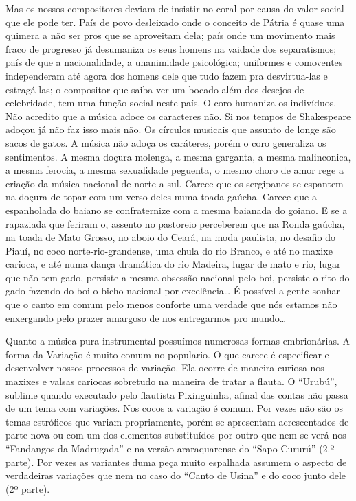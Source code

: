 Mas os nossos compositores deviam de insistir no coral por causa do
valor social que ele pode ter. País de povo desleixado onde o conceito
de Pátria é quase uma quimera a não ser pros que se aproveitam dela;
país onde um movimento mais fraco de progresso já desumaniza os seus
homens na vaidade dos separatismos; país de que a nacionalidade, a
unanimidade psicológica; uniformes e comoventes independeram até agora
dos homens dele que tudo fazem pra desvirtua-las e estragá-las; o
compositor que saiba ver um bocado além dos desejos de celebridade, tem
uma função social neste país. O coro humaniza os indivíduos. Não
acredito que a música adoce os caracteres não. Si nos tempos de
Shakespeare adoçou já não faz isso mais não. Os círculos musicais que
assunto de longe são sacos de gatos. A música não adoça os caráteres,
porém o coro generaliza os sentimentos. A mesma doçura molenga, a mesma
garganta, a mesma malinconica, a mesma ferocia, a mesma sexualidade
peguenta, o mesmo choro de amor rege a criação da música nacional de
norte a sul. Carece que os sergipanos se espantem na doçura de topar com
um verso deles numa toada gaúcha. Carece que a espanholada do baiano se
confraternize com a mesma baianada do goiano. E se a rapaziada que
feriram o, assento no pastoreio perceberem que na Ronda gaúcha, na toada
de Mato Grosso, no aboio do Ceará, na moda paulista, no desafio do
Piauí, no coco norte-rio-grandense, uma chula do rio Branco, e até no
maxixe carioca, e até numa dança dramática do rio Madeira, lugar de mato
e rio, lugar que não tem gado, persiste a mesma obsessão nacional pelo
boi, persiste o rito do gado fazendo do boi o bicho nacional por
excelência\ldots{} É possível a gente sonhar que o canto em comum pelo menos
conforte uma verdade que nós estamos não enxergando pelo prazer amargoso
de nos entregarmos pro mundo\ldots{}

Quanto a música pura instrumental possuímos numerosas formas
embrionárias. A forma da Variação é muito comum no populario. O que
carece é especificar e desenvolver nossos processos de variação. Ela
ocorre de maneira curiosa nos maxixes e valsas cariocas sobretudo na
maneira de tratar a flauta. O ``Urubú'', sublime quando executado pelo
flautista Pixinguinha, afinal das contas não passa de um tema com
variações. Nos cocos a variação é comum. Por vezes não são os temas
estróficos que variam propriamente, porém se apresentam acrescentados de
parte nova ou com um dos elementos substituídos por outro que nem se
verá nos ``Fandangos da Madrugada'' e na versão araraquarense do ``Sapo
Cururú'' (2.º parte). Por vezes as variantes duma peça muito espalhada
assumem o aspecto de verdadeiras variações que nem no caso do ``Canto de
Usina'' e do coco junto dele (2º parte).

